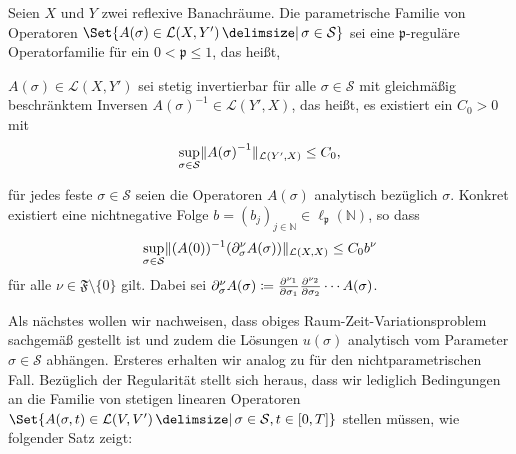 \begin{Annahme}
\label{thm:kunoth:assumption1}
    Seien $X$ und $Y$ zwei reflexive Banachräume.
    Die parametrische Familie von Operatoren
    $\Set{ A(\sigma) \in \mathcal L(X, Y') \given \sigma \in \mathcal S }$ sei eine $\mathfrak p$-reguläre Operatorfamilie für ein $0 < \mathfrak p \leq 1$, das heißt,
    \begin{thmenumerate}
        \item $A(\sigma) \in \mathcal L(X, Y')$ sei stetig invertierbar für alle $\sigma \in \mathcal S$ mit gleichmäßig beschränktem Inversen $A{(\sigma)}^{-1} \in \mathcal L(Y', X)$, das heißt, es existiert ein $C_{0} > 0$ mit
        \begin{equation}
            \sup_{\sigma \in \mathcal S} \lVert A{(\sigma)}^{-1}\rVert_{\mathcal L(Y', X)} \leq C_{0},
        \end{equation}
        \item für jedes feste $\sigma \in \mathcal S$ seien die Operatoren $A(\sigma)$ analytisch bezüglich $\sigma$.
        Konkret existiert eine nichtnegative Folge $b = (b_{j})_{j \in \mathbb{N}} \in \ell_{\mathfrak p}(\mathbb{N})$, so dass
        \begin{equation}
            \sup_{\sigma \in \mathcal S} \lVert(A{(0)})^{-1}(\partial^{\nu}_{\sigma} A(\sigma))\rVert_{\mathcal L(X, X)} \leq C_{0} b^{\nu}
        \end{equation}
        für alle $\nu \in \mathfrak F \setminus \{ 0 \}$ gilt.
        Dabei sei $\partial^{\nu}_{\sigma} A(\sigma) \coloneqq \frac{\partial^{\nu_{1}}}{\partial \sigma_{1}} \frac{\partial^{\nu_{2}}}{\partial \sigma_{2}} \cdots A(\sigma)$.
    \end{thmenumerate}
\end{Annahme}

Als nächstes wollen wir nachweisen, dass obiges Raum-Zeit-Variationsproblem sachgemäß gestellt ist und zudem die Lösungen $u(\sigma)$ analytisch vom Parameter $\sigma \in \mathcal S$ abhängen.
Ersteres erhalten wir analog zu  für den nichtparametrischen Fall.
Bezüglich der Regularität stellt sich heraus, dass wir lediglich Bedingungen an die Familie von stetigen linearen Operatoren $\Set{ A(\sigma, t) \in \mathcal L(V, V') \given \sigma \in \mathcal S, t \in [0, T] }$ stellen müssen, wie folgender Satz zeigt:

